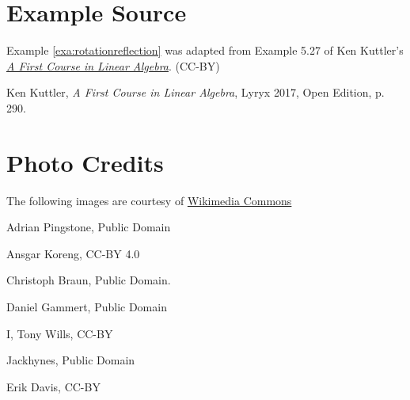 \documentclass{ximera}
\begin{document}
\section*{Example Source}
Example \ref{exa:rotationreflection}  was adapted from Example 5.27  of Ken Kuttler's \href{https://open.umn.edu/opentextbooks/textbooks/a-first-course-in-linear-algebra-2017}{\it A First Course in Linear Algebra}. (CC-BY)

Ken Kuttler, {\it  A First Course in Linear Algebra}, Lyryx 2017, Open Edition, p. 290. 


\section*{Photo Credits}
The following images are courtesy of \href{https://commons.wikimedia.org/wiki/Main_Page}
{Wikimedia Commons}

Adrian Pingstone,  Public Domain

Ansgar Koreng,  CC-BY 4.0

Christoph Braun,  Public Domain.

Daniel Gammert,  Public Domain

 I, Tony Wills,   CC-BY

Jackhynes,  Public Domain

Erik Davis,  CC-BY
\end{document}
